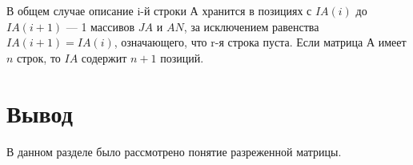 В общем случае описание i-й строки $А$ хранится в позициях с $IA(i)$ до $IA(i + 1)$ --- 1 массивов $JA$ и $AN$, за исключением
равенства $IA(i + 1) = IA(i)$, означающего, что r-я строка пуста.
Если матрица $А$ имеет $n$ строк, то $IA$ содержит $n + 1$ позиций. 

\section*{Вывод}
В данном разделе было рассмотрено понятие разреженной матрицы.
